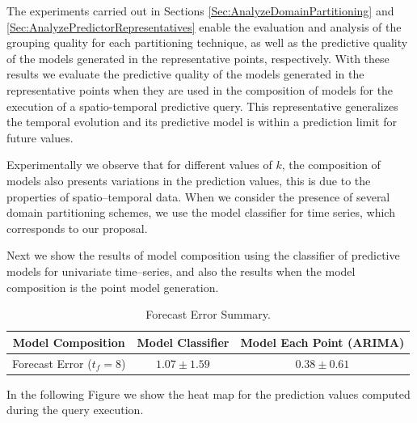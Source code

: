 The experiments carried out in Sections \ref{Sec:AnalyzeDomainPartitioning} and \ref{Sec:AnalyzePredictorRepresentatives} enable the evaluation and analysis of the grouping quality for each partitioning technique, as well as the predictive quality of the models generated in the representative points, respectively. With these results we evaluate the predictive quality of the models generated in the representative points when they are used in the composition of models for the execution of a spatio-temporal predictive query. 
This representative generalizes the temporal evolution and its predictive model is within a prediction limit for future values.

Experimentally we observe that for different values of $k$, the composition of models also presents variations in the prediction values, this is due to the properties of spatio--temporal data. When we consider the presence of several domain partitioning schemes, we use the model classifier for time series, which corresponds to our proposal.

Next we show the results of model composition using the classifier of predictive models for univariate time--series, and also the results when the model composition is the point model generation.

\begin{table}[h!]
	\centering
	\tiny
	\begin{tabular}{|c|c|c|}
		\hline
		Model Composition & Model Classifier & Model Each Point (ARIMA)\\
		\hline
		Forecast Error ($t_{f}=8$) & $1.07 \pm 1.59$ & $0.38 \pm 0.61$ \\
		\hline
	\end{tabular}
	\caption{Forecast Error Summary.}
	\label{Table:Query10x10_Classfier_Point_Each_StatSummary}
\end{table}
In the following Figure we show the heat map for the prediction values computed during the query execution.

